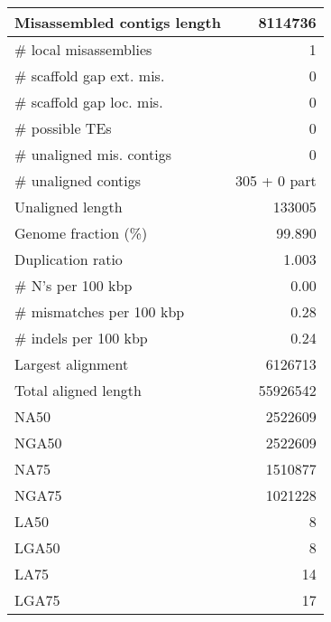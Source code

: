 \documentclass[12pt,a4paper]{article}
\begin{document}
\begin{table}[ht]
\begin{center}
\begin{tabular}{|l*{1}{|r}|}
Misassembled contigs length & 8114736 \\ \hline
\# local misassemblies & 1 \\ \hline
\# scaffold gap ext. mis. & 0 \\ \hline
\# scaffold gap loc. mis. & 0 \\ \hline
\# possible TEs & 0 \\ \hline
\# unaligned mis. contigs & 0 \\ \hline
\# unaligned contigs & 305 + 0 part \\ \hline
Unaligned length & 133005 \\ \hline
Genome fraction (\%) & 99.890 \\ \hline
Duplication ratio & 1.003 \\ \hline
\# N's per 100 kbp & 0.00 \\ \hline
\# mismatches per 100 kbp & 0.28 \\ \hline
\# indels per 100 kbp & 0.24 \\ \hline
Largest alignment & 6126713 \\ \hline
Total aligned length & 55926542 \\ \hline
NA50 & 2522609 \\ \hline
NGA50 & 2522609 \\ \hline
NA75 & 1510877 \\ \hline
NGA75 & 1021228 \\ \hline
LA50 & 8 \\ \hline
LGA50 & 8 \\ \hline
LA75 & 14 \\ \hline
LGA75 & 17 \\ \hline
\end{tabular}
\end{center}
\end{table}
\end{document}
